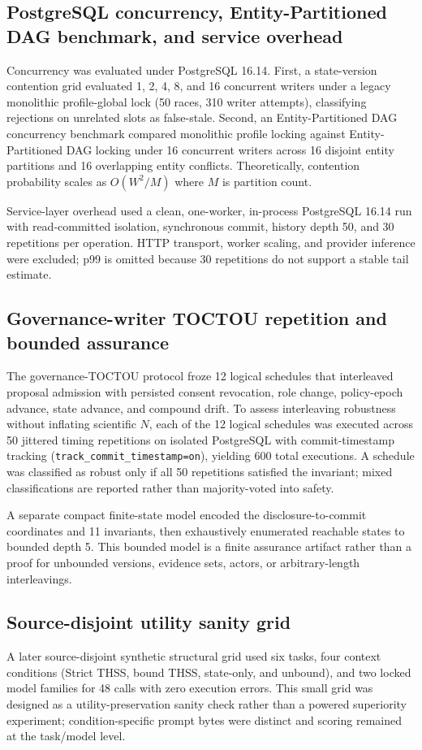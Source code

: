 \documentclass[11pt]{article}
\begin{document}
\subsection{PostgreSQL concurrency, Entity-Partitioned DAG benchmark, and service overhead}
Concurrency was evaluated under PostgreSQL 16.14. First, a state-version contention grid evaluated 1, 2, 4, 8, and 16 concurrent writers under a legacy monolithic profile-global lock (50 races, 310 writer attempts), classifying rejections on unrelated slots as false-stale. Second, an Entity-Partitioned DAG concurrency benchmark compared monolithic profile locking against Entity-Partitioned DAG locking under 16 concurrent writers across 16 disjoint entity partitions and 16 overlapping entity conflicts. Theoretically, contention probability scales as $O(W^2 / M)$ where $M$ is partition count.

Service-layer overhead used a clean, one-worker, in-process PostgreSQL 16.14 run with read-committed isolation, synchronous commit, history depth 50, and 30 repetitions per operation. HTTP transport, worker scaling, and provider inference were excluded; p99 is omitted because 30 repetitions do not support a stable tail estimate.

\subsection{Governance-writer TOCTOU repetition and bounded assurance}
The governance-TOCTOU protocol froze 12 logical schedules that interleaved proposal admission with persisted consent revocation, role change, policy-epoch advance, state advance, and compound drift. To assess interleaving robustness without inflating scientific $N$, each of the 12 logical schedules was executed across 50 jittered timing repetitions on isolated PostgreSQL with commit-timestamp tracking (\texttt{track\_commit\_timestamp=on}), yielding 600 total executions. A schedule was classified as robust only if all 50 repetitions satisfied the invariant; mixed classifications are reported rather than majority-voted into safety.

A separate compact finite-state model encoded the disclosure-to-commit coordinates and 11 invariants, then exhaustively enumerated reachable states to bounded depth 5. This bounded model is a finite assurance artifact rather than a proof for unbounded versions, evidence sets, actors, or arbitrary-length interleavings.

\subsection{Source-disjoint utility sanity grid}
A later source-disjoint synthetic structural grid used six tasks, four context conditions (Strict THSS, bound THSS, state-only, and unbound), and two locked model families for 48 calls with zero execution errors. This small grid was designed as a utility-preservation sanity check rather than a powered superiority experiment; condition-specific prompt bytes were distinct and scoring remained at the task/model level.
\end{document}

